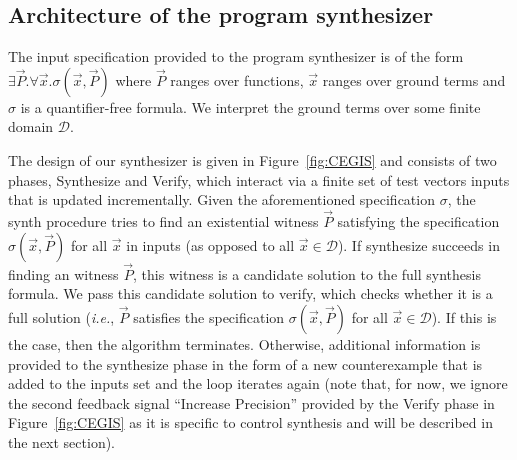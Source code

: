 \documentclass{sig-alternate-05-2015}
\newcommand{\red}[1]{{\color{red}#1}}
\begin{document}


\subsection{Architecture of the program synthesizer}
\label{synthesizer-general}
%
% 
The input specification provided to the program synthesizer is of the form
$\exists \vec{P} .  \forall \vec{x}.  \sigma(\vec{x}, \vec{P})$ where
$\vec{P}$ ranges over functions, $\vec{x}$ ranges over ground terms and
$\sigma$ is a quantifier-free formula.  We interpret the ground terms over
some finite domain $\mathcal{D}$.

The design of our synthesizer is given in Figure~\ref{fig:CEGIS} and consists
of two phases, {\sc Synthesize} and {\sc Verify}, which interact via a
finite set of test vectors {\sc inputs} that is updated incrementally. 
Given the aforementioned specification $\sigma$, the {\sc synth} procedure
tries to find an existential witness $\vec{P}$ satisfying the specification
$\sigma(\vec{x}, \vec{P})$ for all $\vec{x}$ in {\sc inputs} (as opposed to
all $\vec{x} \in \mathcal{D}$).
%
If {\sc synthesize} succeeds in finding an witness $\vec{P}$, this witness
is a candidate solution to the full synthesis formula.  We pass this
candidate solution to {\sc verify}, which checks whether it is a full
solution ({\it i.e.}, $\vec{P}$ satisfies the specification $\sigma(\vec{x},
\vec{P})$ for all $\vec{x}\in\mathcal{D}$).
%
%
%
If this is the case, then the algorithm terminates.  Otherwise, additional
information is provided to the {\sc synthesize} phase in the form of a new
counterexample that is added to the {\sc inputs} set and the loop iterates
again (note that, for now, we ignore the second feedback signal ``Increase
Precision'' provided by the {\sc Verify} phase in Figure~\ref{fig:CEGIS} as it
is specific to control synthesis and will be described in the next section).
\end{document}

